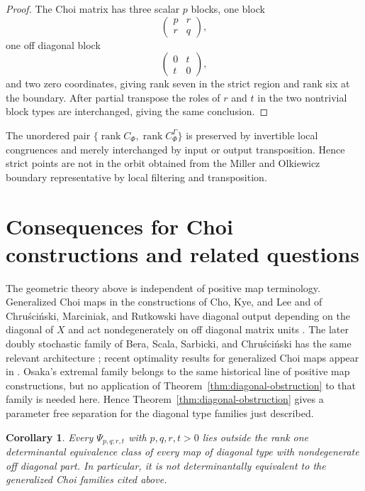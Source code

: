 \documentclass[11pt]{amsart}
\newcommand{\chg}[1]{#1}
\newcommand{\rank}{\operatorname{rank}}
\theoremstyle{plain}
\newtheorem{corollary}[theorem]{Corollary}
\theoremstyle{definition}
\theoremstyle{remark}
\begin{document}
\begin{proof}
The Choi matrix has three scalar $p$ blocks, one block
\[
\begin{pmatrix}p&r\\r&q\end{pmatrix},
\]
one \chg{off diagonal} block
\[
\begin{pmatrix}0&t\\t&0\end{pmatrix},
\]
and two zero coordinates, giving rank seven in the strict region and rank six at the boundary. After partial transpose the roles of $r$ and $t$ in the two nontrivial block types are interchanged, giving the same conclusion.
\end{proof}

The unordered pair $\{\rank C_\Phi,\rank C_\Phi^\Gamma\}$ is preserved by invertible local congruences and merely interchanged by input or output transposition. Hence strict points are not in the \chg{orbit obtained from the Miller and Olkiewicz boundary representative by local filtering and transposition}.

\section{Consequences for Choi constructions and related questions}\label{sec:consequences}

The geometric theory above is independent of positive map terminology. Generalized Choi maps in the constructions of Cho, Kye, and Lee and of Chru\'sci\'nski, Marciniak, and Rutkowski have diagonal output depending on the diagonal of $X$ and act nondegenerately on \chg{off diagonal} matrix units \cite{ChoKyeLee1992,ChruscinskiMarciniakRutkowski2018}. The later doubly stochastic family of Bera, Scala, Sarbicki, and Chru\'sci\'nski has the same relevant architecture \cite{Bera2025}; recent optimality results for generalized Choi maps appear in \cite{ScalaEtAl2024}. \chg{Osaka's extremal family \cite{Osaka1992} belongs to the same historical line of positive map constructions, but no application of Theorem~\ref{thm:diagonal-obstruction} to that family is needed here.} Hence Theorem~\ref{thm:diagonal-obstruction} gives a \chg{parameter free} separation for the \chg{diagonal type} families just described.

\begin{corollary}\label{cor:choi-separation}
\chg{Every $\Psi_{p,q;r,t}$ with {$p,q,r,t>0$} lies outside the rank one determinantal equivalence class of every map of diagonal type with nondegenerate off diagonal part. In particular, it is not determinantally equivalent to the generalized Choi families cited above.}
\end{corollary}
\end{document}
